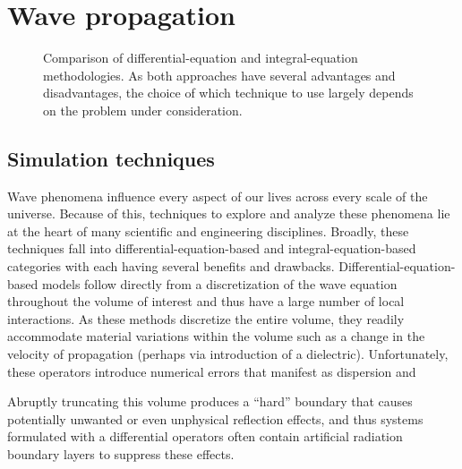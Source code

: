 \section{Wave propagation}

\begin{figure}
  \centering
  
  \caption{\label{fig:mindmap} Comparison of differential-equation and integral-equation methodologies.
    As both approaches have several advantages and disadvantages, the choice of which technique to use largely depends on the problem under consideration.
  }
\end{figure}

\subsection{Simulation techniques}

Wave phenomena influence every aspect of our lives across every scale of the universe.
Because of this, techniques to explore and analyze these phenomena lie at the heart of many scientific and engineering disciplines.
Broadly, these techniques fall into differential-equation-based and integral-equation-based categories with each having several benefits and drawbacks.
Differential-equation-based models follow directly from a discretization of the wave equation throughout the volume of interest and thus have a large number of local interactions.
As these methods discretize the entire volume, they readily accommodate material variations within the volume such as a change in the velocity of propagation (perhaps via introduction of a dielectric).
Unfortunately, these operators introduce numerical errors that manifest as dispersion and

Abruptly truncating this volume produces a ``hard'' boundary that causes potentially unwanted or even unphysical reflection effects, and thus systems formulated with a differential operators often contain artificial radiation boundary layers to suppress these effects.

